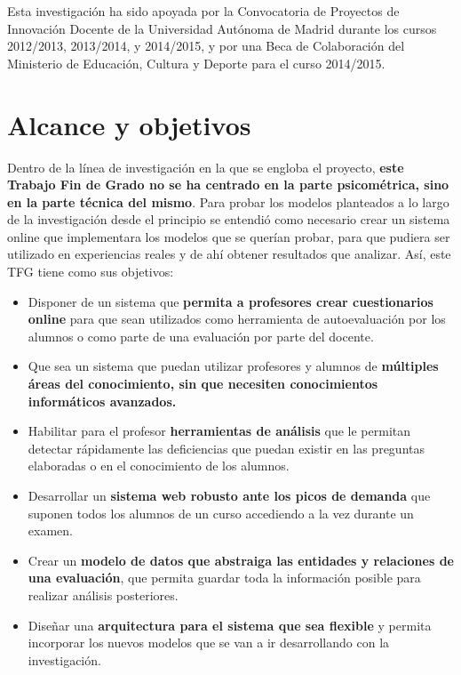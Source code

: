 Esta investigación ha sido apoyada por la Convocatoria de Proyectos de Innovación Docente de la Universidad Autónoma de Madrid durante los cursos 2012/2013, 2013/2014, y 2014/2015, y por una Beca de Colaboración del Ministerio de Educación, Cultura y Deporte para el curso 2014/2015.

\section{Alcance y objetivos}


Dentro de la línea de investigación en la que se engloba el proyecto, \textbf{este Trabajo Fin de Grado no se ha centrado en la parte psicométrica, sino en la parte técnica del mismo}. Para probar los modelos planteados a lo largo de la investigación desde el principio se entendió como necesario crear un sistema online que implementara los modelos que se querían probar, para que pudiera ser utilizado en experiencias reales y de ahí obtener resultados que analizar. Así, este TFG tiene como sus objetivos:

\begin{itemize}
	\item Disponer de un sistema que \textbf{permita a profesores crear cuestionarios online} para que sean utilizados como herramienta de autoevaluación por los alumnos o como parte de una evaluación por parte del docente.
	\item Que sea un sistema que puedan utilizar profesores y alumnos de \textbf{múltiples áreas del conocimiento, sin que necesiten conocimientos informáticos avanzados.}
	\item Habilitar para el profesor \textbf{herramientas de análisis} que le permitan detectar rápidamente las deficiencias que puedan existir en las preguntas  elaboradas o en el conocimiento de los alumnos.
	\item Desarrollar un \textbf{sistema web robusto ante los picos de demanda} que suponen todos los alumnos de un curso accediendo a la vez durante un examen.
	\item Crear un \textbf{modelo de datos que abstraiga las entidades y relaciones de una evaluación}, que permita guardar toda la información posible para realizar análisis posteriores.
	\item Diseñar una \textbf{arquitectura para el sistema que sea flexible} y permita incorporar los nuevos modelos que se van a ir desarrollando con la investigación.
\end{itemize}

